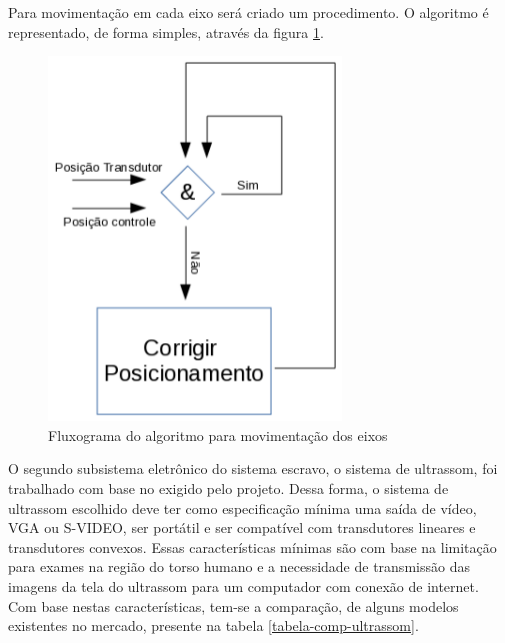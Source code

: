 Para movimentação em cada eixo será criado um procedimento. O algoritmo é representado, de forma simples, através da figura \ref{des_fig18}.

\begin{figure}[H]
	\centering	\includegraphics[keepaspectratio=true,scale=0.6]{figuras/algoritmo_motor.png}
	\caption{Fluxograma do algoritmo para movimentação dos eixos}
	\label{des_fig18}
\end{figure}

O segundo subsistema eletrônico do sistema escravo, o sistema de ultrassom, foi trabalhado com base no exigido pelo projeto. Dessa forma, o sistema de ultrassom escolhido deve ter como especificação mínima uma saída de vídeo, VGA ou S-VIDEO, ser portátil e ser compatível com transdutores lineares e transdutores convexos. Essas características mínimas são com base na limitação para exames na região do torso humano e a necessidade de transmissão das imagens da tela do ultrassom para um computador com conexão de internet. Com base nestas características, tem-se a comparação, de alguns modelos existentes no mercado, presente na tabela \ref{tabela-comp-ultrassom}.

